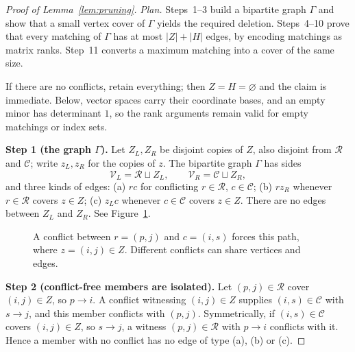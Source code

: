 \documentclass[11pt]{article}
\theoremstyle{remark}
\newcommand{\abs}[1]{\lvert #1\rvert}
\newcommand{\step}[1]{\par\smallskip\noindent\textbf{Step #1.}}
\newcommand{\cR}{\mathcal R}
\newcommand{\cC}{\mathcal C}
\begin{document}
\begin{proof}[Proof of Lemma~\ref{lem:pruning}]
\emph{Plan.} Steps~1--3 build a bipartite graph $\Gamma$ and show that a small
vertex cover of $\Gamma$ yields the required deletion. Steps~4--10 prove that
every matching of $\Gamma$ has at most $\abs Z+\abs H$ edges, by encoding
matchings as matrix ranks. Step~11 converts a maximum matching into a cover of
the same size.

If there are no conflicts, retain everything; then $Z=H=\varnothing$ and the
claim is immediate. Below, vector spaces carry their coordinate bases, and an
empty minor has determinant $1$, so the rank arguments remain valid for empty
matchings or index sets.

\step{1 (the graph $\Gamma$)} Let $Z_L,Z_R$ be disjoint copies of $Z$, also
disjoint from $\cR$ and $\cC$; write $z_L,z_R$ for the copies of $z$. The
bipartite graph $\Gamma$ has sides
\[
 \mathcal V_L=\cR\sqcup Z_L,\qquad\mathcal V_R=\cC\sqcup Z_R,
\]
and three kinds of edges: (a) $rc$ for conflicting $r\in\cR$, $c\in\cC$;
(b) $rz_R$ whenever $r\in\cR$ covers $z\in Z$; (c) $z_Lc$ whenever $c\in\cC$
covers $z\in Z$. There are no edges between $Z_L$ and $Z_R$. See
Figure~\ref{fig:pruning}.

\begin{figure}[!ht]
 \centering
 \caption{A conflict between $r=(p,j)$ and $c=(i,s)$ forces this path, where
 $z=(i,j)\in Z$. Different conflicts can share vertices and edges.}
 \label{fig:pruning}
\end{figure}

\step{2 (conflict-free members are isolated)} Let $(p,j)\in\cR$ cover
$(i,j)\in Z$, so $p\to i$. A conflict witnessing $(i,j)\in Z$ supplies
$(i,s)\in\cC$ with $s\to j$, and this member conflicts with $(p,j)$.
Symmetrically, if $(i,s)\in\cC$ covers $(i,j)\in Z$, so $s\to j$, a witness
$(p,j)\in\cR$ with $p\to i$ conflicts with it. Hence a member with no conflict
has no edge of type (a), (b) or (c).


\end{proof}
\end{document}
